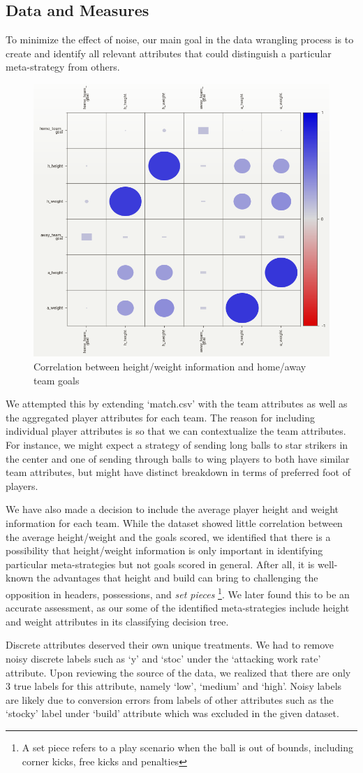 \documentclass{article}
\begin{document}
\subsection{Data and Measures}
To minimize the effect of noise, our main goal in the data wrangling process is to create and identify all relevant attributes that could distinguish a particular meta-strategy from others. 
\begin{figure}[H]
\centering
    \includegraphics[width=.6\textwidth]{htwt_vs_goals.png}
    \caption{Correlation between height/weight information and home/away team goals}
\end{figure}
\par We attempted this by extending `match.csv' with the team attributes as well as the aggregated player attributes for each team. The reason for including individual player attributes is so that we can contextualize the team attributes. For instance, we might expect a strategy of sending long balls to star strikers in the center and one of sending through balls to wing players to both have similar team attributes, but might have distinct breakdown in terms of preferred foot of players. 

\par We have also made a decision to include the average player height and weight information for each team. While the dataset showed little correlation between the average height/weight and the goals scored, we identified that there is a possibility that height/weight information is only important in identifying particular meta-strategies but not goals scored in general. After all, it is well-known the advantages that height and build can bring to challenging the opposition in headers, possessions, and \emph{set pieces} \footnote{A set piece refers to a play scenario when the ball is out of bounds, including corner kicks, free kicks and penalties}. We later found this to be an accurate assessment, as our some of the identified meta-strategies include height and weight attributes in its classifying decision tree. 
\par Discrete attributes deserved their own unique treatments. We had to remove noisy discrete labels such as `y' and `stoc' under the `attacking work rate' attribute. Upon reviewing the source of the data, we realized that there are only 3 true labels for this attribute, namely `low', `medium' and `high'. Noisy labels are likely due to conversion errors from labels of other attributes such as the `stocky' label under `build' attribute which was excluded in the given dataset. 
\end{document}
